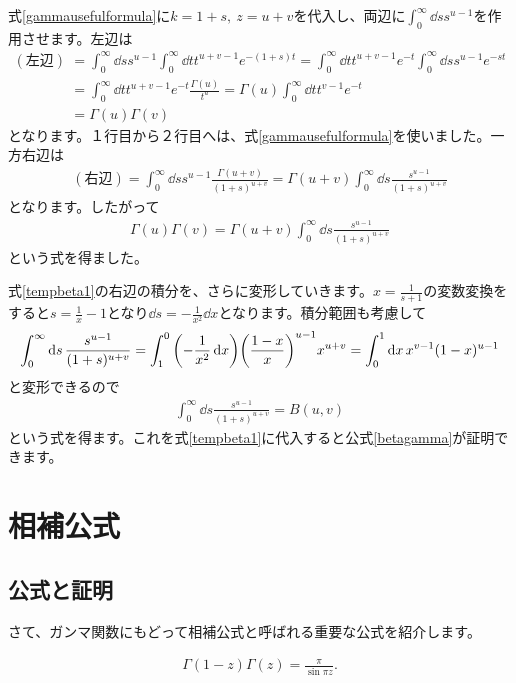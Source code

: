 \documentclass[report,paper=a4, fontsize=12pt, line_length=16cm, number_of_lines=33,dvipdfmx]{jlreq}
\newenvironment{important}{\begin{tcolorbox}[
  colback = white,
  colframe = red!35,
  boxrule = 2mm,
  fonttitle = \bfseries,
  after = \noindent] }{\end{tcolorbox}}
\numberwithin{equation}{section}
\begin{document}
式\eqref{gammausefulformula}に$k=1+s,\ z=u+v$を代入し、両辺に$\int_{0}^{\infty}\dd{s} s^{u-1}$を作用させます。左辺は
\begin{align}
  (\text{左辺})
  &=\int_{0}^{\infty}\dd{s} s^{u-1}\int_{0}^{\infty}\dd{t}t^{u+v-1}e^{-(1+s)t}
  =\int_{0}^{\infty}\dd{t}t^{u+v-1}e^{-t}\int_{0}^{\infty}\dd{s} s^{u-1}e^{-st}\nonumber\\
  &=\int_{0}^{\infty}\dd{t}t^{u+v-1}e^{-t}\frac{\Gamma(u)}{t^{u}}
  =\Gamma(u)\int_{0}^{\infty}\dd{t}t^{v-1}e^{-t}\nonumber\\
  &=\Gamma(u)\Gamma(v)
\end{align}
となります。１行目から２行目へは、式\eqref{gammausefulformula}を使いました。一方右辺は
\begin{align}
  (\text{右辺})=\int_{0}^{\infty}\dd{s} s^{u-1}\frac{\Gamma(u+v)}{(1+s)^{u+v}}=\Gamma(u+v)\int_{0}^{\infty}\dd{s} \frac{s^{u-1}}{(1+s)^{u+v}}
\end{align}
となります。したがって
\begin{align}
  \Gamma(u)\Gamma(v)=\Gamma(u+v)\int_{0}^{\infty}\dd{s} \frac{s^{u-1}}{(1+s)^{u+v}}\label{tempbeta1}
\end{align}
という式を得ました。

式\eqref{tempbeta1}の右辺の積分を、さらに変形していきます。$x=\frac{1}{s+1}$の変数変換をすると$s=\frac{1}{x}-1$となり$\dd{s}=-\frac{1}{x^2} \dd{x}$となります。積分範囲も考慮して
\begin{align}
  \int_{0}^{\infty}\dd{s} \frac{s^{u-1}}{(1+s)^{u+v}}
  =\int_{1}^{0}\qty(-\frac{1}{x^2} \dd{x})\qty(\frac{1-x}{x})^{u-1}x^{u+v}
  =\int_{0}^{1}\dd{x}x^{v-1}(1-x)^{u-1}
\end{align}
と変形できるので
\begin{align}
  \int_{0}^{\infty}\dd{s} \frac{s^{u-1}}{(1+s)^{u+v}}=B(u,v)\label{betaformula2}
\end{align}
という式を得ます。これを式\eqref{tempbeta1}に代入すると公式\eqref{betagamma}が証明できます。

\section{相補公式}
\subsection{公式と証明}
さて、ガンマ関数にもどって相補公式と呼ばれる重要な公式を紹介します。
\begin{important}
  \begin{align}
    \Gamma(1-z)\Gamma(z)=\frac{\pi}{\sin\pi z}.\label{reflectionformula}
  \end{align}
\end{important}
\end{document}
